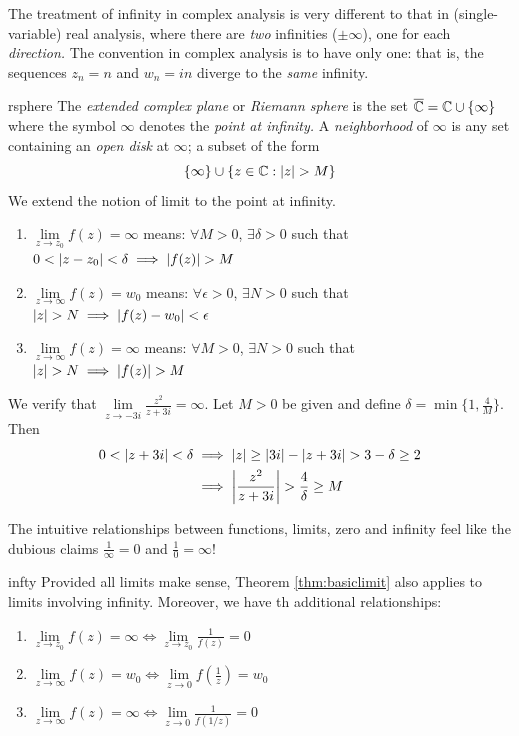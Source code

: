 \vfil\goodbreak


The treatment of infinity in complex analysis is very different to that in (single-variable) real analysis, where there are \emph{two} infinities ($\pm\infty$), one for each \emph{direction.} The convention in complex analysis is to have only one: that is, the sequences $z_n=n$ and $w_n=in$ diverge to the \emph{same} infinity.

\begin{defn}{}{rsphere}
The \emph{extended complex plane} or \emph{Riemann sphere} is the set $\overline{\mathbb{C}}=\mathbb{C}\cup\{\infty\}$ where the symbol $\infty$ denotes the \emph{point at infinity.}\smallbreak
A \emph{neighborhood} of $\infty$ is any set containing an \emph{open disk} at $\infty$; a subset of the form
\[\{\infty\}\cup\{z\in\C:\nm{z}>M\}\]
We extend the notion of limit to the point at infinity.
\begin{enumerate}
  \item $\lim\limits_{z\to z_0}f(z)=\infty$ means: $\forall M>0$, $\exists \delta>0$ such that $0<\nm{z-z_0}<\delta \implies \nm{f(z)}>M$
  \item $\lim\limits_{z\to \infty}f(z)=w_0$ means: $\forall \epsilon>0$, $\exists N>0$ such that $\nm{z}>N \implies \nm{f(z)-w_0}<\epsilon$
  \item $\lim\limits_{z\to\infty}f(z)=\infty$ means: $\forall M>0$, $\exists N>0$ such that $\nm{z}>N\implies \nm{f(z)}>M$
\end{enumerate}
\end{defn}

\begin{example}{}{}
We verify that $\lim\limits_{z\to -3i}\frac{z^2}{z+3i}=\infty$.\smallbreak
Let $M>0$ be given and define $\delta=\min\{1,\frac 4{M}\}$. Then
  	\begin{align*}
  	0<\nm{z+3i}<\delta&\implies \nm z\ge \nm{3i}-\nm{z+3i}>3-\delta\ge 2\\
  	&\implies\nm{\frac{z^2}{z+3i}} > \frac{4}{\delta} \ge M
  	\end{align*}
\end{example}


The intuitive relationships between functions, limits, zero and infinity feel like the dubious claims $\frac 1\infty=0$ and $\frac 10=\infty$!

\begin{thm}{}{infty}
Provided all limits make sense, Theorem \ref{thm:basiclimit} also applies to limits involving infinity. Moreover, we have th additional relationships:
\begin{enumerate}
  \item $\lim\limits_{z\to z_0}f(z)=\infty \iff \lim\limits_{z\to z_0}\frac 1{f(z)}=0$
  \item $\lim\limits_{z\to\infty}f(z)=w_0 \iff \lim\limits_{z\to 0}f\left(\frac 1z\right)=w_0$
  \item $\lim\limits_{z\to \infty}f(z)=\infty \iff \lim\limits_{z\to 0}\frac 1{f(1/z)}=0$
\end{enumerate}
\end{thm}

